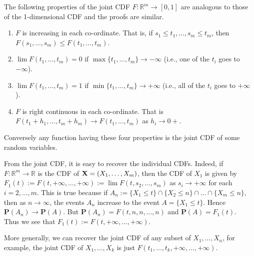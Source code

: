 \documentclass[preprint,  11pt]{amsart}
\newcommand{\para}[1]{\vspace{4mm}\noindent{\bfseries #1:}}
\theoremstyle{plain} %
\theoremstyle{definition} %
\begin{document}
\para{Properties of joint CDFs} The following properties of the joint CDF $F:\mathbb{R}^{m}\rightarrow [0,1]$ are analogous to those of the 1-dimensional CDF and the proofs are similar.
\begin{enumerate}\setlength\itemsep{6pt}
\item $F$ is increasing in each co-ordinate. That is, if $s_{1}\le t_{1},\ldots ,s_{m}\le t_{m}$, then $F(s_{1},\ldots,s_{m})\le F(t_{1},\ldots ,t_{m})$.
\item $\lim F(t_{1},\ldots,t_{m})=0$ if $\max\{t_{1},\ldots ,t_{m}\}\rightarrow -\infty$ (i.e., one of the $t_{i}$ goes to $-\infty$).
\item $\lim F(t_{1},\ldots,t_{m})=1$ if $\min\{t_{1},\ldots ,t_{m}\}\rightarrow +\infty$ (i.e., all of the $t_{i}$ goes to $+\infty$).
\item $F$ is right continuous in each co-ordinate. That is $F(t_{1}+h_{1},\ldots ,t_{m}+h_{m})\rightarrow F(t_{1},\ldots ,t_{m})$ as $h_{i}\rightarrow 0+$.
\end{enumerate}
Conversely any function having these four properties is the joint CDF of some random variables.

From the joint CDF, it is easy to recover the individual CDFs. Indeed, if $F:\mathbb{R}^{m}\rightarrow \mathbb{R}$ is the CDF of ${\bf X}=(X_{1},\ldots ,X_{m})$, then the CDF of $X_{1}$ is given by $F_{1}(t):=F(t,+\infty,\ldots,+\infty):=\lim F(t,s_{2},\ldots,s_{m})$ as $s_{i}\rightarrow +\infty$ for each $i=2,\ldots ,m$. This is true because if $A_{n}:=\{X_{1}\le t\}\cap\{X_{2}\le n\}\cap \ldots \cap\{X_{m}\le n\}$, then as $n\rightarrow \infty$, the events $A_{n}$ increase to the event $A=\{X_{1}\le t\}$. Hence $\mathbf{P}(A_{n})\rightarrow \mathbf{P}(A)$. But $\mathbf{P}(A_{n})=F(t,n,n,\ldots,n)$ and $\mathbf{P}(A)=F_{1}(t)$. Thus we see that $F_{1}(t):=F(t,+\infty,\ldots,+\infty)$.

 More generally, we can recover the joint CDF of any subset of $X_{1},\ldots ,X_{n}$, for example, the joint CDF of $X_{1},\ldots ,X_{k}$ is just $F(t_{1},\ldots ,t_{k},+\infty,\ldots ,+\infty)$.
\end{document}
